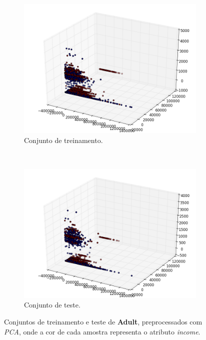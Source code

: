 \documentclass[12pt]{report}
\begin{document}
\begin{figure}[H]
	\centering
	\begin{subfigure}[b]{0.45\textwidth}
		\includegraphics[width=\textwidth]{assets/train-data}
		\caption{Conjunto de treinamento.}
		\label{fig:ds_adult_train}
	\end{subfigure}
	~\begin{subfigure}[b]{0.45\textwidth}
		\includegraphics[width=\textwidth]{assets/test-data}
		\caption{Conjunto de teste.}
		\label{fig:ds_adult_test}
	\end{subfigure}
	\caption{Conjuntos de treinamento e teste de \textbf{Adult}, preprocessados com \textit{PCA}, onde a cor de cada amostra representa o atributo \textit{income}.}\label{fig:adult_ds}
\end{figure}
\end{document}
